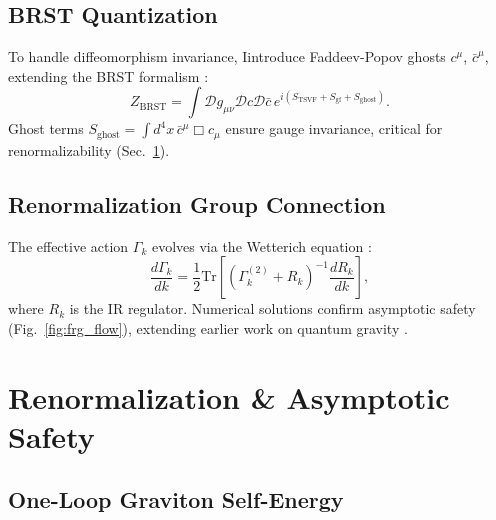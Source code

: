 \documentclass[twocolumn,superscriptaddress,floatfix]{revtex4-2}
\begin{document}
\subsection{BRST Quantization}  
\label{subsec:brst}  

To handle diffeomorphism invariance, Iintroduce Faddeev-Popov ghosts \( c^\mu \), \(\bar{c}^\mu \), extending the BRST formalism \cite{Henneaux1992}:  
\begin{equation}  
Z_{\text{BRST}} = \int \mathcal{D}g_{\mu\nu} \mathcal{D}c \mathcal{D}\bar{c} \, e^{i\left(S_{\text{TSVF}} + S_{\text{gf}} + S_{\text{ghost}}\right)}.  
\label{eq:brst}  
\end{equation}  
Ghost terms \( S_{\text{ghost}} = \int d^4x \, \bar{c}^\mu \Box c_\mu \) ensure gauge invariance, critical for renormalizability (Sec.~\ref{sec:renorm}).  

\subsection{Renormalization Group Connection}  
\label{subsec:rg_connection}  

The effective action \(\Gamma_k\) evolves via the Wetterich equation \cite{Wetterich1993}:  
\begin{equation}  
\frac{d\Gamma_k}{dk} = \frac{1}{2} \text{Tr}\left[\left(\Gamma_k^{(2)} + R_k\right)^{-1} \frac{dR_k}{dk}\right],  
\label{eq:wetterich}  
\end{equation}  
where \( R_k \) is the IR regulator. Numerical solutions confirm asymptotic safety (Fig.~\ref{fig:frg_flow}), extending earlier work on quantum gravity \cite{Reuter1998}.  

\section{Renormalization \& Asymptotic Safety}  
\label{sec:renorm}  

\subsection{One-Loop Graviton Self-Energy}  
\label{subsec:oneloop}  
\end{document}
